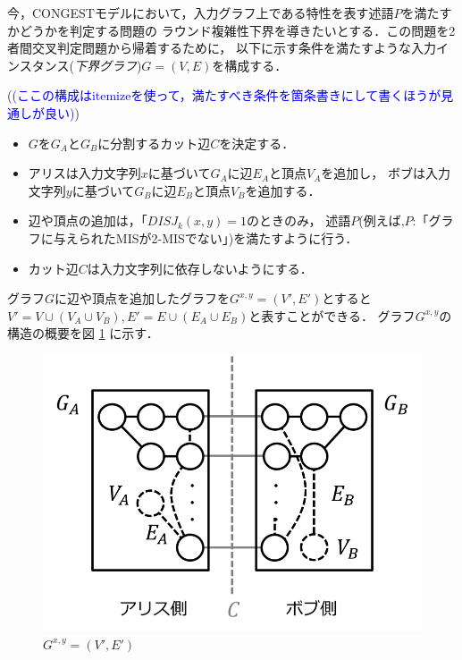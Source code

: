 \documentclass[12pt]{thesis}
\newcommand{\Izumi}[1]{\textcolor{blue}{(#1)}}
\newcommand{\CONGEST}{\textsf{CONGEST}}
\theoremstyle{definition}
\begin{document}
今，{\CONGEST}モデルにおいて，入力グラフ上である特性を表す述語$P$を満たすかどうかを判定する問題の
ラウンド複雑性下界を導きたいとする．この問題を2者間交叉判定問題から帰着するために，
以下に示す条件を満たすような入力インスタンス(\emph{下界グラフ})$G = (V, E)$を構成する．

(\Izumi{ここの構成はitemizeを使って，満たすべき条件を箇条書きにして書くほうが見通しが良い})
\begin{itemize}
\item $G$を$G_{A}$と$G_{B}$に分割するカット辺$C$を決定する．
\item アリスは入力文字列$x$に基づいて$G_{A}$に辺$E_{A}$と頂点$V_{A}$を追加し，
ボブは入力文字列$y$に基づいて$G_{B}$に辺$E_{B}$と頂点$V_{B}$を追加する．
\item 辺や頂点の追加は，「$DISJ_{k} (x, y)=1$のときのみ，
述語$P$(例えば,$P$:「グラフに与えられたMISが2-MISでない」)を満たすように行う．
\item カット辺$C$は入力文字列に依存しないようにする．
\end{itemize}
グラフ$G$に辺や頂点を追加したグラフを$G^{x, y} = (V', E')$とすると
$V' = V \cup (V_{A} \cup V_{B}), E' = E \cup (E_{A} \cup E_{B})$と表すことができる．
グラフ$G^{x, y}$の構造の概要を図 \ref{Gxy} に示す．

\begin{figure}[ht]
\begin{center}
\includegraphics[width=120mm]{Gxy.png}
\end{center}
\caption{$G^{x, y} = (V', E')$}
\label{Gxy}
\end{figure}
\end{document}
